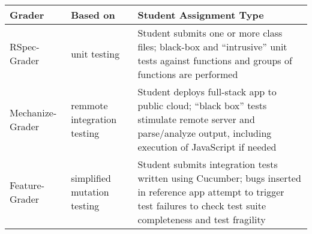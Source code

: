 \begin{tabular}{|p{}|p{}|p{}|}
 \hline
 \textbf{Grader} & \textbf{Based on} & \textbf{Student Assignment Type} \\
 \hline
 RSpec-Grader &
 unit testing &
 Student submits one or more class files; black-box and ``intrusive''
 unit tests against functions and groups of functions are performed
 \\
\hline
 Mechanize-Grader & 
 remmote integration testing &
 Student deploys full-stack app to public cloud; ``black box'' tests
 stimulate remote server and parse/analyze output, including execution
 of JavaScript if needed
 \\
\hline
 Feature-Grader &
 simplified mutation testing &
 Student submits integration tests written using Cucumber; bugs inserted
 in reference app attempt to trigger test failures to check test suite
 completeness and test fragility
 \\
 \hline
\end{tabular}
